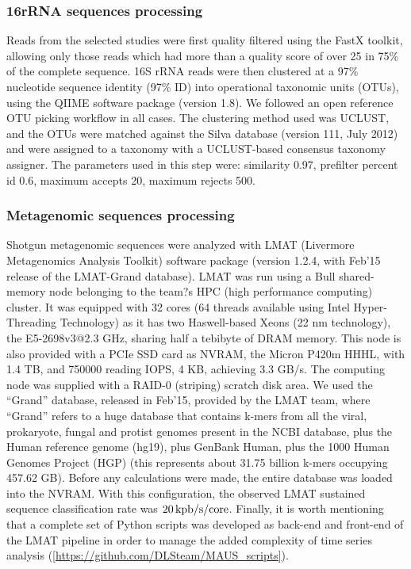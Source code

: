 \subsubsection*{16rRNA sequences processing}
Reads from the selected studies were first quality filtered using the FastX toolkit\cite{FASTX}, allowing only those reads which had more than a quality score of over 25 in 75\% of the complete sequence. 16S rRNA reads were then clustered at a 97\% nucleotide sequence identity (97\% ID) into operational taxonomic units (OTUs), using the QIIME software package\cite{QIIME} (version 1.8). We followed an open reference OTU picking workflow in all cases. The clustering method used was UCLUST, and the OTUs were matched against the Silva database\cite{SILVA} (version 111, July 2012) and were assigned to a taxonomy with a UCLUST-based consensus taxonomy assigner. The parameters used in this step were: similarity 0.97, prefilter percent id 0.6, maximum accepts 20, maximum rejects 500. 

\subsubsection*{Metagenomic sequences processing}
Shotgun metagenomic sequences were analyzed with LMAT (Livermore Metagenomics Analysis Toolkit) software package\cite{LMAT} (version 1.2.4, with Feb'15 release of the LMAT-Grand database). LMAT was run using a Bull shared-memory node belonging to the team?s HPC (high performance computing) cluster. It was equipped with 32 cores (64 threads available using Intel Hyper-Threading Technology) as it has two Haswell-based Xeons (22 nm technology), the E5-2698v3@2.3 GHz, sharing half a tebibyte of DRAM memory. This node is also provided with a PCIe SSD card as NVRAM, the Micron P420m HHHL, with 1.4 TB, and 750000 reading IOPS, 4 KB, achieving 3.3 GB/s. The computing node was supplied with a RAID-0 (striping) scratch disk area. We used the ``Grand'' database\cite{LMAT2}, released in Feb'15, provided by the LMAT team, where ``Grand'' refers to a huge database that contains k-mers from all the viral, prokaryote, fungal and protist genomes present in the NCBI database, plus the Human reference genome (hg19), plus GenBank Human, plus the 1000 Human Genomes Project (HGP) (this represents about 31.75 billion k-mers occupying 457.62 GB)\cite{LMAT2}. Before any calculations were made, the entire database was loaded into the NVRAM. With this configuration, the observed LMAT sustained sequence classification rate was $20\operatorname{kpb/s/core}$. Finally, it is worth mentioning that a complete set of Python scripts  was developed as back-end and front-end of the LMAT pipeline in order to manage the added complexity of time series analysis (\href{https://github.com/DLSteam/MAUS_scripts}{[https://github.com/DLSteam/MAUS\_scripts]}). 


